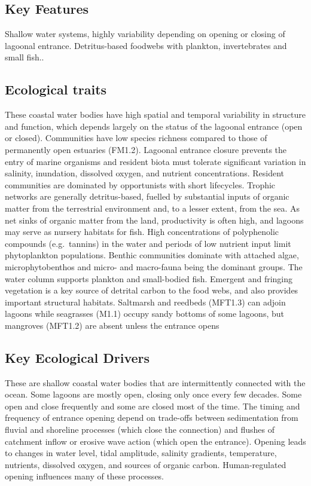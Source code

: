 \documentclass[
  letterpaper,
  DIV=11,
  numbers=noendperiod]{scrartcl}
\begin{document}
\subsection{Key Features}\label{key-features-24}

Shallow water systems, highly variability depending on opening or
closing of lagoonal entrance. Detritus-based foodwebs with plankton,
invertebrates and small fish..

\subsection{Ecological traits}\label{ecological-traits-24}

These coastal water bodies have high spatial and temporal variability in
structure and function, which depends largely on the status of the
lagoonal entrance (open or closed). Communities have low species
richness compared to those of permanently open estuaries (FM1.2).
Lagoonal entrance closure prevents the entry of marine organisms and
resident biota must tolerate significant variation in salinity,
inundation, dissolved oxygen, and nutrient concentrations. Resident
communities are dominated by opportunists with short lifecycles. Trophic
networks are generally detritus-based, fuelled by substantial inputs of
organic matter from the terrestrial environment and, to a lesser extent,
from the sea. As net sinks of organic matter from the land, productivity
is often high, and lagoons may serve as nursery habitats for fish. High
concentrations of polyphenolic compounds (e.g.~tannins) in the water and
periods of low nutrient input limit phytoplankton populations. Benthic
communities dominate with attached algae, microphytobenthos and micro-
and macro-fauna being the dominant groups. The water column supports
plankton and small-bodied fish. Emergent and fringing vegetation is a
key source of detrital carbon to the food webs, and also provides
important structural habitats. Saltmarsh and reedbeds (MFT1.3) can
adjoin lagoons while seagrasses (M1.1) occupy sandy bottoms of some
lagoons, but mangroves (MFT1.2) are absent unless the entrance opens

\subsection{Key Ecological Drivers}\label{key-ecological-drivers-24}

These are shallow coastal water bodies that are intermittently connected
with the ocean. Some lagoons are mostly open, closing only once every
few decades. Some open and close frequently and some are closed most of
the time. The timing and frequency of entrance opening depend on
trade-offs between sedimentation from fluvial and shoreline processes
(which close the connection) and flushes of catchment inflow or erosive
wave action (which open the entrance). Opening leads to changes in water
level, tidal amplitude, salinity gradients, temperature, nutrients,
dissolved oxygen, and sources of organic carbon. Human-regulated opening
influences many of these processes.
\end{document}
